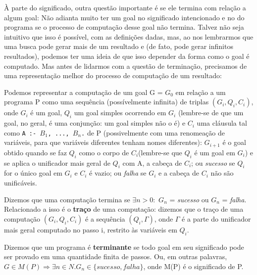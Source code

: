 \documentclass{article}
\theoremstyle{definition}
\theoremstyle{remark}
\begin{document}
À parte do significado, outra questão importante é se ele termina com relação a algum goal: Não adianta muito ter um goal no significado intencionado e no do programa se o processo de computação desse goal não termina. Talvez não seja intuitivo que isso é possível, com as definições dadas, mas, ao nos lembrarmos que uma busca pode gerar mais de um resultado e (de fato, pode gerar infinitos resultados), podemos ter uma ideia de que isso depender da forma como o goal é
computado. Mas antes de lidarmos com a questão de terminação, precisamos de uma representação melhor do processo de computação de um resultado:

Podemos representar a computação de um goal G = $G_0$ em relação a um programa P como uma sequência (possívelmente infinita) de triplas \textit{$(G_i, Q_i, C_i)$}, onde $G_i$ é um
goal, $Q_i$ um goal simples ocorrendo em $G_i$ (lembre-se de que um goal, no geral, é uma conjunção: um goal simples não o é) e $C_i$ uma cláusula tal como  {\tt A :- $B_1$, ..., $B_n$.} de P (possivelmente com uma renomeação de variáveis, para que variáveis diferentes tenham nomes diferentes): $G_{i+1}$ é o goal obtido quando se faz $Q_i$ como o corpo de $C_i$(lembre-se que $Q_i$ é um goal em $G_i$) e se aplica o unificador mais geral de $Q_i$ com A, a cabeça de $C_i$; ou \textit{sucesso} se
$Q_i$ for o único goal em $G_i$ e $C_i$ é vazio; ou \textit{falha} se $G_i$ e a cabeça de $C_i$ não são unificáveis.

Dizemos que uma computação termina se $\exists n > 0:$ $G_n$ = \textit{sucesso} ou $G_n$ = \textit{falha}. Relacionado a isso é o \textbf{traço} de uma computação: dizemos que o traço de uma computação $(G_i, Q_i, C_i)$ é a sequência $(Q_i, \Gamma)$, onde $\Gamma$ é a parte do unificador mais geral computado no passo i, restrito às variáveis em $Q_i$.

Dizemos que um programa é \textbf{terminante} se todo goal em seu significado pode ser provado em uma quantidade finita de passos. Ou, em outras palavras, $G \in M(P) \Rightarrow \exists n \in N. G_n \in \{sucesso, falha\}$, onde M(P) é o significado de P.
\end{document}
